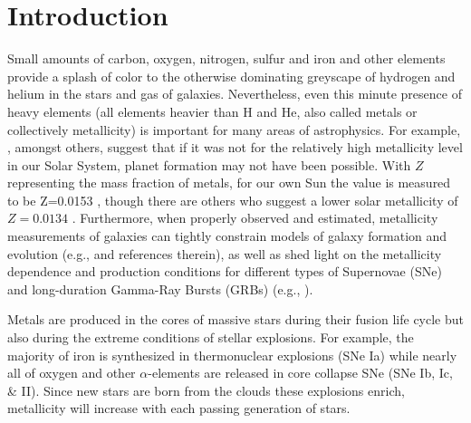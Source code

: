 \documentclass{emulateapj}
\begin{document}
\section{Introduction}
Small amounts of carbon, oxygen, nitrogen, sulfur and iron and
 other elements provide a splash of color to the otherwise dominating greyscape of hydrogen and helium in the stars and gas of galaxies. Nevertheless, even this minute presence of heavy elements (all elements heavier than H and He, also called metals or collectively metallicity) is important for many areas of astrophysics. For example, \citet{johnson12}, amongst others, 
suggest that if it was not for the relatively high metallicity level in our Solar System, planet formation may not have been possible. With $Z$ representing the mass fraction of metals, for our own Sun the value is measured to be  Z=0.0153 \citep{chaffau11}, though there are others who suggest a lower solar metallicity of $Z=0.0134$  \citep{asplund09_rev,grevesse10}. 
Furthermore, when properly observed and estimated, metallicity measurements of galaxies can tightly constrain models of galaxy formation and evolution (e.g., \citealt{kewley08} and references therein), as well as shed light on the metallicity dependence and production conditions for different types of Supernovae (SNe) and long-duration Gamma-Ray Bursts (GRBs) (e.g., \citealt{modjaz08_Z,levesque10_grbhosts,anderson10,modjaz11,kelly12,sanders12,lunnan14,leloudas14,pan14}).

Metals are produced in the cores of massive stars during their fusion life cycle but also during the extreme conditions of stellar explosions. For example, the majority of iron is synthesized in thermonuclear explosions (SNe Ia) while nearly all of oxygen and other $\alpha$-elements are released in core collapse SNe (SNe Ib, Ic, \& II). Since new stars are born from the clouds these explosions enrich, metallicity will increase with each passing generation of stars. 

\end{document}
